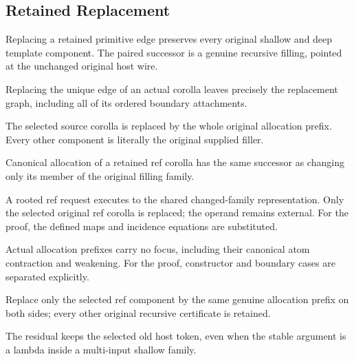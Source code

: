 \subsection{Retained Replacement}
Replacing a retained primitive edge preserves every original shallow and deep template component. The paired successor is a genuine recursive filling, pointed at the unchanged original host wire.

Replacing the unique edge of an actual corolla leaves precisely the replacement graph, including all of its ordered boundary attachments.
\par{}

The selected source corolla is replaced by the whole original allocation prefix. Every other component is literally the original supplied filler.
\par{}

Canonical allocation of a retained ref corolla has the same successor as changing only its member of the original filling family.
\par{}

A rooted ref request executes to the shared changed-family representation. Only the selected original ref corolla is replaced; the operand remains external.
For the proof, the defined maps and incidence equations are substituted.
\par{}

Actual allocation prefixes carry no focus, including their canonical atom contraction and weakening.
For the proof, constructor and boundary cases are separated explicitly.
\par{}

Replace only the selected ref component by the same genuine allocation prefix on both sides; every other original recursive certificate is retained.
\par{}

The residual keeps the selected old host token, even when the stable argument is a lambda inside a multi-input shallow family.
\par{}

